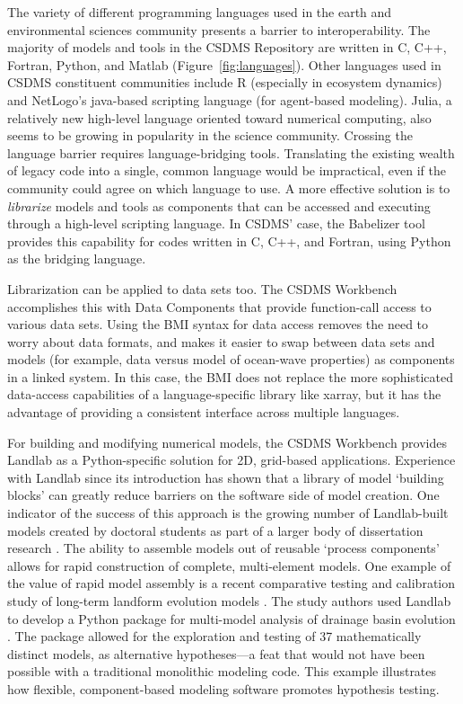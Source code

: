 \documentclass[12pt]{amsart}
\begin{document}
The variety of different programming languages used in the earth and environmental sciences community presents a barrier to interoperability. The majority of models and tools in the CSDMS Repository are written in C, C++, Fortran, Python, and Matlab (Figure~\ref{fig:languages}). Other languages used in CSDMS constituent communities include R (especially in ecosystem dynamics) and NetLogo's java-based scripting language (for agent-based modeling). Julia, a relatively new high-level language oriented toward numerical computing, also seems to be growing in popularity in the science community. Crossing the language barrier requires language-bridging tools. Translating the existing wealth of legacy code into a single, common language would be impractical, even if the community could agree on which language to use. A more effective solution is to \textit{librarize} models and tools \citep{brown2014run} as components that can be accessed and executing through a high-level scripting language. In CSDMS' case, the Babelizer tool provides this capability for codes written in C, C++, and Fortran, using Python as the bridging language.

Librarization can be applied to data sets too. The CSDMS Workbench accomplishes this with Data Components that provide function-call access to various data sets. Using the BMI syntax for data access removes the need to worry about data formats, and makes it easier to swap between data sets and models (for example, data versus model of ocean-wave properties) as components in a linked system. In this case, the BMI does not replace the more sophisticated data-access capabilities of a language-specific library like xarray, but it has the advantage of providing a consistent interface across multiple languages.

For building and modifying numerical models, the CSDMS Workbench provides Landlab as a Python-specific solution for 2D, grid-based applications. Experience with Landlab since its introduction has shown that a library of model `building blocks' can greatly reduce barriers on the software side of model creation. One indicator of the success of this approach is the growing number of  Landlab-built models created by doctoral students as part of a larger body of dissertation research \citep[e.g.,][]{adams2017landlab,gray2017off,shobe2017space,lai2018modeled,langston2018developing,schmid2018effect,strauch2018hydroclimatological,glade2019canyon,reitman2019offset,carriere2020impact,litwin2020groundwaterdupuitpercolator}. The ability to assemble models out of reusable `process components' allows for rapid construction of complete, multi-element models. One example of the value of rapid model assembly is a recent  comparative testing and calibration study of long-term landform evolution models \citep{barnhart2020inverting1,barnhart2020inverting2}. The study authors used Landlab to develop a Python package for multi-model analysis of drainage basin evolution \citep{barnhart2019terrainbento}. The package allowed for the exploration and testing of 37 mathematically distinct models, as alternative hypotheses---a feat that would not have been possible with a traditional monolithic modeling code. This example illustrates how flexible, component-based modeling software promotes hypothesis testing. 
\end{document}
